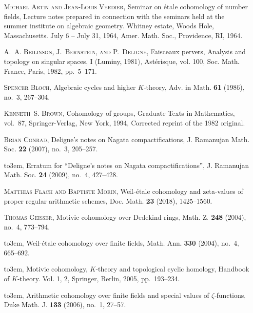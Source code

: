 \documentclass[draft,leqno,12pt]{article}
\theoremstyle{plain}
\theoremstyle{definition}
\begin{document}
\begin{thebibliography}{99}

\providecommand{\bysame}{\leavevmode\hbox to3em{\hrulefill}\thinspace}

\textsc{Michael Artin and Jean-Louis Verdier}, Seminar on \'{e}tale cohomology of
  number fields, Lecture notes prepared in connection with the seminars held
  at the summer institute on algebraic geometry. Whitney estate, {W}oods
  {H}ole, {M}assachusetts. July 6 -- {J}uly 31, 1964, Amer. Math. Soc.,
  Providence, RI,
  1964.

\textsc{A.~A. Beilinson, J.~Bernstein, and P.~Deligne}, Faisceaux pervers,
  Analysis and topology on singular spaces, {I} ({L}uminy, 1981),
  Ast\'{e}risque, vol. 100, Soc. Math. France, Paris, 1982, pp.~5--171.

\textsc{Spencer Bloch}, Algebraic cycles and higher {$K$}-theory, Adv. in Math.
  \textbf{61} (1986), no.~3, 267--304.

\textsc{Kenneth~S. Brown}, Cohomology of groups, Graduate Texts in Mathematics,
  vol.~87, Springer-Verlag, New York, 1994, Corrected reprint of the 1982
  original.

\textsc{Brian Conrad}, Deligne's notes on {N}agata compactifications, J.
  Ramanujan Math. Soc. \textbf{22} (2007), no.~3, 205--257.

\bysame, Erratum for ``{D}eligne's notes on {N}agata
  compactifications'', J. Ramanujan Math. Soc. \textbf{24} (2009), no.~4,
  427--428.

\textsc{Matthias Flach and Baptiste Morin}, Weil-\'{e}tale cohomology and
  zeta-values of proper regular arithmetic schemes, Doc. Math. \textbf{23}
  (2018), 1425--1560.

\textsc{Thomas Geisser}, Motivic cohomology over {D}edekind rings, Math. Z.
  \textbf{248} (2004), no.~4, 773--794.

\bysame, Weil-\'{e}tale cohomology over finite fields, Math. Ann.
  \textbf{330} (2004), no.~4, 665--692.

\bysame, Motivic cohomology, {$K$}-theory and topological cyclic
  homology, Handbook of {$K$}-theory. {V}ol. 1, 2, Springer, Berlin, 2005,
  pp.~193--234.

\bysame, Arithmetic cohomology over finite fields and special values of
  {$\zeta$}-functions, Duke Math. J. \textbf{133} (2006), no.~1, 27--57.


\end{thebibliography}
\end{document}
